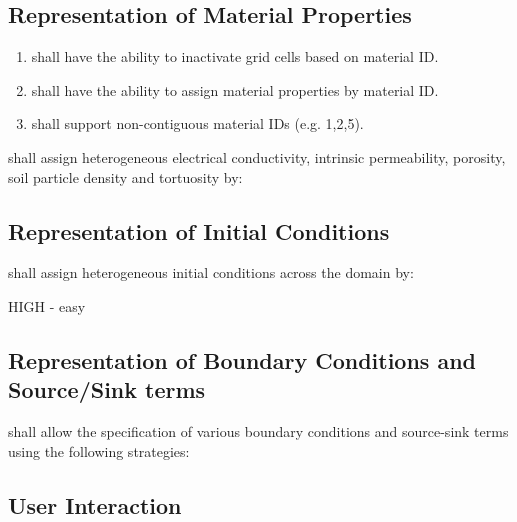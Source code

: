 \subsection{Representation of Material Properties}
\begin{enumerate}
	\item \pft shall have the ability to inactivate grid cells based on material ID.
	\item \pft shall have the ability to assign material properties by material ID.
	\item \pft shall support non-contiguous material IDs (e.g. 1,2,5).
\end{enumerate}
\vspace{0.25cm}
\noindent\pft shall assign heterogeneous electrical conductivity, intrinsic permeability, porosity, soil particle density and tortuosity by:
\begin{enumerate}[resume]
	\assignbyregion  \label{repMatPropRegions}
	\assignbycoordinate \label{repMatPropLocation}
	\assignbycellid \label{repMatPropCellID}
\end{enumerate}


\subsection{Representation of Initial Conditions}
\pft shall assign heterogeneous initial conditions across the domain by:
\begin{enumerate}
    \assignbyregion \label{repICRegions}
	\assignbycoordinate \label{repICLocation}
	\assignbycellid \label{repICCellID}
\end{enumerate}
HIGH - easy

\subsection{Representation of Boundary Conditions and Source/Sink terms}
\pft shall allow the specification of various boundary conditions and source-sink terms using the following strategies:
\begin{enumerate}
	\assignbyregion \label{repBCRegions}
	\assignbycoordinate \label{repBCLocation}
\end{enumerate}

\subsection{User Interaction}
